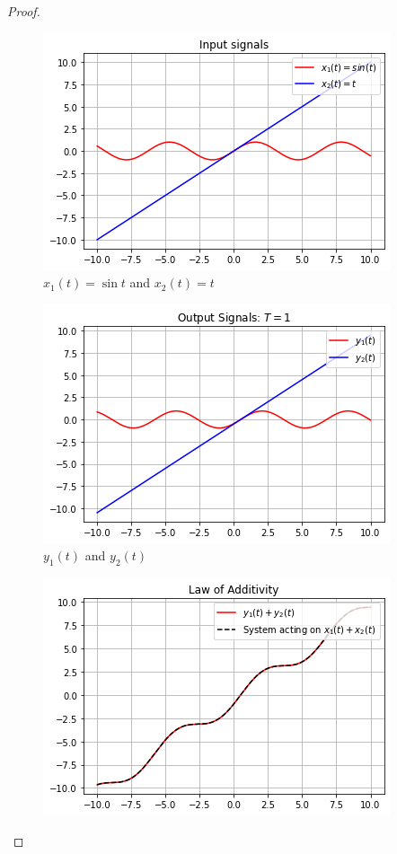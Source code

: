 \documentclass[journal,12pt,twocolumn]{IEEEtran}
\begin{document}
\begin{proof}
\begin{figure}[!ht]
\centering
 \includegraphics[width=\columnwidth]{graphs/input_signals.png}
 \caption{$x_1(t) = \sin{t}$ and $x_2(t) = t$}
 \end{figure}
\begin{figure}[!ht]
\centering
 \includegraphics[width=\columnwidth]{graphs/output_signals.png}
 \caption{$y_1(t)$ and  $y_2(t)$}
 \end{figure}
 \begin{figure}[!ht]
\centering
 \includegraphics[width=\columnwidth]{graphs/law_of_additivity.png}

\end{figure}
\end{proof}
\end{document}
